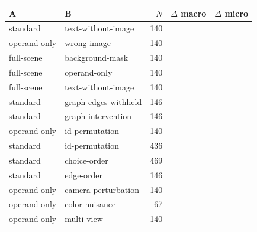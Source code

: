 \begin{tabularx}{\linewidth}{XXrrr}
\toprule
A & B & $N$ & $\Delta$ macro & $\Delta$ micro\\\midrule
standard & text-without-image & 140 &  & \\
operand-only & wrong-image & 140 &  & \\
full-scene & background-mask & 140 &  & \\
full-scene & operand-only & 140 &  & \\
full-scene & text-without-image & 140 &  & \\
standard & graph-edges-withheld & 146 &  & \\
standard & graph-intervention & 146 &  & \\
operand-only & id-permutation & 140 &  & \\
standard & id-permutation & 436 &  & \\
standard & choice-order & 469 &  & \\
standard & edge-order & 146 &  & \\
operand-only & camera-perturbation & 140 &  & \\
operand-only & color-nuisance & 67 &  & \\
operand-only & multi-view & 140 &  & \\
\bottomrule
\end{tabularx}
